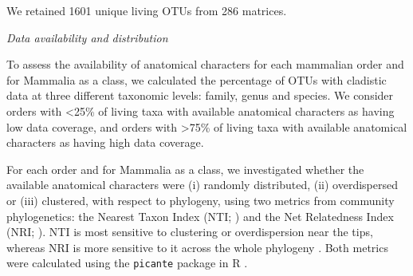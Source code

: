 \documentclass[12pt,letterpaper]{article}
\renewcommand{\subsection}[1]{%
\bigskip
\begin{center}
\begin{large}
\normalfont\itshape #1
\end{large}
\end{center}}
\begin{document}
We retained 1601 unique living OTUs from 286 matrices.

\subsection{Data availability and distribution}
To assess the availability of anatomical characters for each mammalian order and for Mammalia as a class, we calculated the percentage of OTUs with cladistic data at three different taxonomic levels: family, genus and species. %
We consider orders with \textless 25\% of living taxa with available anatomical characters as having low data coverage, and orders with \textgreater 75\% of living taxa with available anatomical characters as having high data coverage. 

For each order and for Mammalia as a class, we investigated whether the available anatomical characters were (i) randomly distributed, (ii) overdispersed or (iii) clustered, with respect to phylogeny, using two metrics from community phylogenetics: the Nearest Taxon Index (NTI; \cite{webb2002phylogenies}) and the Net Relatedness Index (NRI; \cite{webb2002phylogenies}). 
NTI is most sensitive to clustering or overdispersion near the tips, whereas NRI is more sensitive to it across the whole phylogeny \cite{Cooper2008}. 
Both metrics were calculated using the \texttt{picante} package in R \cite{picante,R}.
\end{document}
